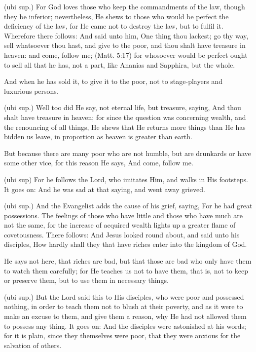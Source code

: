  (ubi sup.) For God loves those who keep the commandments of the law, though they be inferior; nevertheless, He shews to those who would be perfect the deficiency of the law, for He came not to destroy the law, but to fulfil it. Wherefore there follows: And said unto him, One thing thou lackest; go thy way, sell whatsoever thou hast, and give to the poor, and thou shalt have treasure in heaven: and come, follow me; (Matt. 5:17) for whosoever would be perfect ought to sell all that he has, not a part, like Ananias and Sapphira, but the whole.

 And when he has sold it, to give it to the poor, not to stage-players and luxurious persons.

 (ubi sup.) Well too did He say, not eternal life, but treasure, saying, And thou shalt have treasure in heaven; for since the question was concerning wealth, and the renouncing of all things, He shews that He returns more things than He has bidden us leave, in proportion as heaven is greater than earth.

 But because there are many poor who are not humble, but are drunkards or have some other vice, for this reason He says, And come, follow me.

 (ubi sup) For he follows the Lord, who imitates Him, and walks in His footsteps. It goes on: And he was sad at that saying, and went away grieved.

 (ubi sup.) And the Evangelist adds the cause of his grief, saying, For he had great possessions. The feelings of those who have little and those who have much are not the same, for the increase of acquired wealth lights up a greater flame of covetousness. There follows: And Jesus looked round about, and said unto his disciples, How hardly shall they that have riches enter into the kingdom of God.

 He says not here, that riches are bad, but that those are bad who only have them to watch them carefully; for He teaches us not to have them, that is, not to keep or preserve them, but to use them in necessary things.

 (ubi sup.) But the Lord said this to His disciples, who were poor and possessed nothing, in order to teach them not to blush at their poverty, and as it were to make an excuse to them, and give them a reason, why He had not allowed them to possess any thing. It goes on: And the disciples were astonished at his words; for it is plain, since they themselves were poor, that they were anxious for the salvation of others.

